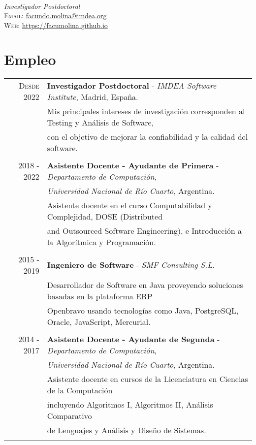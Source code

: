 \documentclass[a4paper,10pt]{article} %
\begin{document}
\pagestyle{empty} %


{} \\
\textit{Investigador Postdoctoral} \\
\textsc{Email:} \href{mailto:facundo.molina@imdea.org}{facundo.molina@imdea.org} \\
\textsc{Web:} \href{https://facumolina.github.io}{https://facumolina.github.io}


\section{Empleo}

\begin{tabular}{rl}
\\
\textsc{Desde 2022}   & \textbf{Investigador Postdoctoral} - \textit{IMDEA Software Institute}, Madrid, España. \\
& Mis principales intereses de investigación corresponden al Testing y Análisis de Software, \\ 
& con el objetivo de mejorar la confiabilidad y la calidad del software. \\ & \\

\textsc{2018 - 2022} & \textbf{Asistente Docente - Ayudante de Primera} - \textit{Departamento de Computación}, \\ 
& \textit{Universidad Nacional de Río Cuarto}, Argentina. \\ 
& Asistente docente en el curso Computabilidad y Complejidad, DOSE (Distributed \\
& and Outsourced Software Engineering), e Introducción a la Algorítmica y Programación. \\ & \\

\textsc{2015 - 2019} & \textbf{Ingeniero de Software} - \textit{SMF Consulting S.L}. \\ 
& Desarrollador de Software en Java proveyendo soluciones basadas en la plataforma ERP \\ 
& Openbravo usando tecnologías como Java, PostgreSQL, Oracle, JavaScript, Mercurial. \\ & \\

\textsc{2014 - 2017} & \textbf{Asistente Docente - Ayudante de Segunda} - \textit{Departamento de Computación}, \\ 
& \textit{Universidad Nacional de Río Cuarto}, Argentina. \\ 
& Asistente docente en cursos de la Licenciatura en Ciencias de la Computación \\ 
& incluyendo Algoritmos I, Algoritmos II, Análisis Comparativo \\ 
& de Lenguajes y Análisis y Diseño de Sistemas. 
\\ & \\
\end{tabular}
\end{document}
